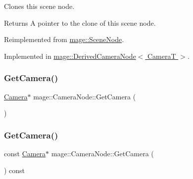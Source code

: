 Clones this scene node.

\begin{DoxyReturn}{Returns}
A pointer to the clone of this scene node. 
\end{DoxyReturn}


Reimplemented from \hyperlink{classmage_1_1_scene_node_a42d0d53ab804d38ebd584d2de6490eeb}{mage\+::\+Scene\+Node}.



Implemented in \hyperlink{classmage_1_1_derived_camera_node_aa965751029ebd6b41d3805b499a8304e}{mage\+::\+Derived\+Camera\+Node$<$ Camera\+T $>$}.

\hypertarget{classmage_1_1_camera_node_aa9887e3bf192d6c078aae2430732cbf8}{}\label{classmage_1_1_camera_node_aa9887e3bf192d6c078aae2430732cbf8} 
\subsubsection{\texorpdfstring{Get\+Camera()}{GetCamera()}\hspace{0.1cm}{\footnotesize\ttfamily [1/2]}}
{\footnotesize\ttfamily \hyperlink{classmage_1_1_camera}{Camera}$\ast$ mage\+::\+Camera\+Node\+::\+Get\+Camera (\begin{DoxyParamCaption}{ }\end{DoxyParamCaption})\hspace{0.3cm}{\ttfamily [noexcept]}}

\hypertarget{classmage_1_1_camera_node_aa911263cfce8cec2a42c6d03d25af606}{}\label{classmage_1_1_camera_node_aa911263cfce8cec2a42c6d03d25af606} 
\subsubsection{\texorpdfstring{Get\+Camera()}{GetCamera()}\hspace{0.1cm}{\footnotesize\ttfamily [2/2]}}
{\footnotesize\ttfamily const \hyperlink{classmage_1_1_camera}{Camera}$\ast$ mage\+::\+Camera\+Node\+::\+Get\+Camera (\begin{DoxyParamCaption}{ }\end{DoxyParamCaption}) const\hspace{0.3cm}{\ttfamily [noexcept]}}


